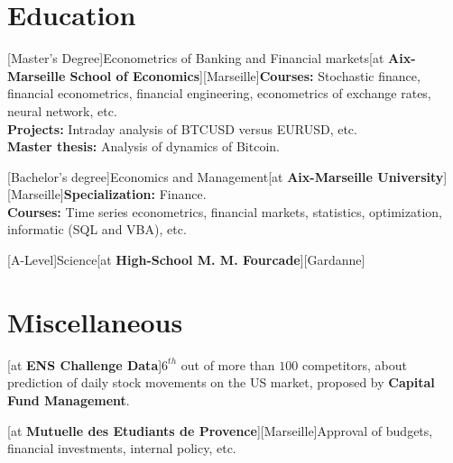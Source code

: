 \documentclass[a4paper]{arthur-cv}
\begin{document}
\begin{textblock}{20.5}
\begin{minipage}[t]{0.61\textwidth}
    \section{Education}
      \begin{rightenv}
        [Master's Degree]{Econometrics of Banking and Financial markets}[at \textbf{Aix-Marseille School of Economics}][Marseille]{\textbf{Courses:} Stochastic finance, financial econometrics, financial engineering, econometrics of exchange rates, neural network, etc.\\\textbf{Projects:} Intraday analysis of BTCUSD versus EURUSD, etc.\\\textbf{Master thesis:} Analysis of dynamics of Bitcoin.}

        [Bachelor's degree]{Economics and Management}[at \textbf{Aix-Marseille University}][Marseille]{\textbf{Specialization:} Finance.\\\textbf{Courses:} Time series econometrics, financial markets, statistics, optimization, informatic (SQL and VBA), etc.}

        [A-Level]{Science}[at \textbf{High-School M. M. Fourcade}][Gardanne]{}
      \end{rightenv}

    \section{Miscellaneous}
      \begin{rightenv}
        [at \textbf{ENS Challenge Data}]{\href{http://datachallenge.cfm.fr/t/end-of-year-ranking-2019-official-top-10/243}{\textcolor{colhyperlink}{$6^{th}$}} out of more than $100$ competitors, about prediction of daily stock movements on the US market, proposed by \textbf{Capital Fund Management}.}

        [at \textbf{Mutuelle des Etudiants de Provence}][Marseille]{Approval of budgets, financial investments, internal policy, etc.}


      \end{rightenv}

  \end{minipage}

\end{textblock}
\end{document}
